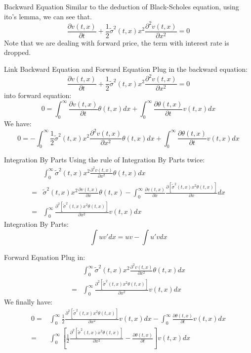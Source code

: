 \documentclass[10pt,table,mathserif]{beamer}
\begin{document}
\begin{frame}{Backward Equation}
Similar to the deduction of Black-Scholes equation, using ito's lemma, we can see that.
\[
\frac{\partial v(t,x)}{\partial t}+\frac{1}{2} \widetilde{\sigma}^2(t,x) x^2 \frac{\partial^2 v(t,x)}{\partial x^2}=0
\]
Note that we are dealing with forward price, the term with interest rate is dropped.
\end{frame}


\begin{frame}{Link Backward Equation and Forward Equation}
Plug in the backward equation:
\[
\frac{\partial v(t,x)}{\partial t}+\frac{1}{2} \widetilde{\sigma}^2(t,x) x^2 \frac{\partial^2 v(t,x)}{\partial x^2}=0
\]
into forward equation:
\[
0=\int_{0}^{\infty} \frac{\partial v(t,x)}{\partial t} \theta(t,x)dx+\int_{0}^{\infty} \frac{\partial \theta(t,x)}{\partial t} v(t,x)dx
\]
We have:
\[
0=-\int_{0}^{\infty}\frac{1}{2} \widetilde{\sigma}^2(t,x) x^2 \frac{\partial^2 v(t,x)}{\partial x^2} \theta(t,x)dx+\int_{0}^{\infty} \frac{\partial \theta(t,x)}{\partial t} v(t,x)dx
\]
\end{frame}



\begin{frame}{Integration By Parts}
Using the rule of Integration By Parts twice:
\[\begin{split}
&\int_{0}^{\infty} \widetilde{\sigma}^2(t,x) x^2 \frac{\partial^2 v(t,x)}{\partial x^2} \theta(t,x)dx\\
=&\widetilde{\sigma}^2(t,x) x^2 \frac{\partial v(t,x)}{\partial x} \theta(t,x)-
\int_{0}^{\infty} \frac{\partial v(t,x)}{\partial x} \frac{\partial [\widetilde{\sigma}^2(t,x) x^2  \theta(t,x)]}{\partial x} dx\\
=&\int_{0}^{\infty}  \frac{\partial^2 [\widetilde{\sigma}^2(t,x) x^2  \theta(t,x)]}{\partial x^2}  v(t,x) dx
\end{split}
\]
Integration By Parts:
\[
\int u v' dx =uv-\int u' v dx
\]
\end{frame}


\begin{frame}{Forward Equation}
Plug in:
\[\begin{split}
&\int_{0}^{\infty} \widetilde{\sigma}^2(t,x) x^2 \frac{\partial^2 v(t,x)}{\partial x^2} \theta(t,x)dx\\
= &\int_{0}^{\infty} \frac{\partial^2 [\widetilde{\sigma}^2(t,x) x^2  \theta(t,x)]}{\partial x^2}  v(t,x)dx
\end{split}
\]
We finally have:
\[\begin{split}
0=&\int_{0}^{\infty} \frac{1}{2} \frac{\partial^2 [\widetilde{\sigma}^2(t,x) x^2  \theta(t,x)]}{\partial x^2}v(t,x) dx-\int_{0}^{\infty} \frac{\partial \theta(t,x)}{\partial t} v(t,x)dx\\
=&\int_{0}^{\infty} [\frac{1}{2} \frac{\partial^2 [\widetilde{\sigma}^2(t,x) x^2  \theta(t,x)]}{\partial x^2} -\frac{\partial \theta(t,x)}{\partial t}] v(t,x)dx
\end{split}
\]
\end{frame}
\end{document}
